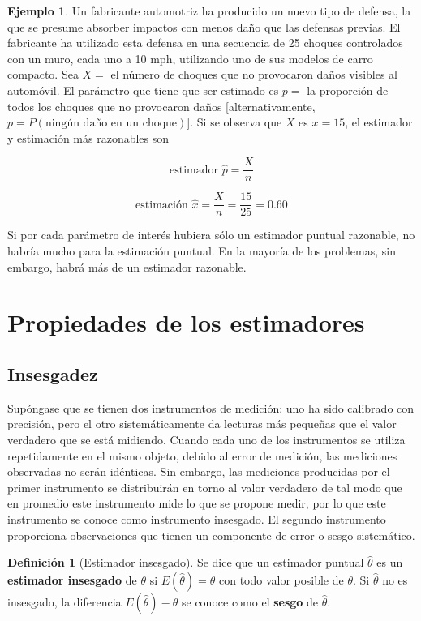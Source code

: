 \documentclass[
  11pt,
]{book}
\theoremstyle{definition}
\newtheorem{definition}{Definición}[chapter]
\theoremstyle{definition}
\newtheorem{example}{Ejemplo}[chapter]
\theoremstyle{definition}
\theoremstyle{definition}
\theoremstyle{remark}
\begin{document}
\begin{example}
Un fabricante automotriz ha producido un nuevo tipo de defensa, la que se presume absorber impactos con menos daño que las defensas previas. El fabricante ha utilizado esta defensa en una secuencia de 25 choques controlados con un muro, cada uno a 10 mph, utilizando uno de sus modelos de carro compacto. Sea \(X =\) el número de choques que no provocaron daños visibles al automóvil. El parámetro que tiene que ser estimado es \(p =\) la proporción de todos los choques que no provocaron daños {[}alternativamente, \(p = P(\text{ningún daño en un choque})\){]}. Si se observa que \(X\) es \(x = 15\), el estimador y estimación más razonables son

\[
\text{estimador } \hat{p} = \frac{X}{n}
\]

\[
\text{estimación } \hat{x} = \frac{X}{n} = \frac{15}{25} = 0.60
\]

Si por cada parámetro de interés hubiera sólo un estimador puntual razonable, no habría mucho para la estimación puntual. En la mayoría de los problemas, sin embargo, habrá más de un estimador razonable.
\end{example}

\section{Propiedades de los estimadores}\label{propiedades-de-los-estimadores}

\subsection{Insesgadez}\label{insesgadez}

Supóngase que se tienen dos instrumentos de medición: uno ha sido calibrado con precisión, pero el otro sistemáticamente da lecturas más pequeñas que el valor verdadero que se está midiendo. Cuando cada uno de los instrumentos se utiliza repetidamente en el mismo objeto, debido al error de medición, las mediciones observadas no serán idénticas. Sin embargo, las mediciones producidas por el primer instrumento se distribuirán en torno al valor verdadero de tal modo que en promedio este instrumento mide lo que se propone medir, por lo que este instrumento se conoce como instrumento insesgado. El segundo instrumento proporciona observaciones que tienen un componente de error o sesgo sistemático.

\begin{definition}[Estimador insesgado]
Se dice que un estimador puntual \(\hat{\theta}\) es un \textbf{estimador insesgado} de \(\theta\) si \(E(\hat{\theta}) = \theta\) con todo valor posible de \(\theta\). Si \(\hat{\theta}\) no es insesgado, la diferencia \(E(\hat{\theta}) - \theta\) se conoce como el \textbf{sesgo} de \(\hat{\theta}\).
\end{definition}
\end{document}
